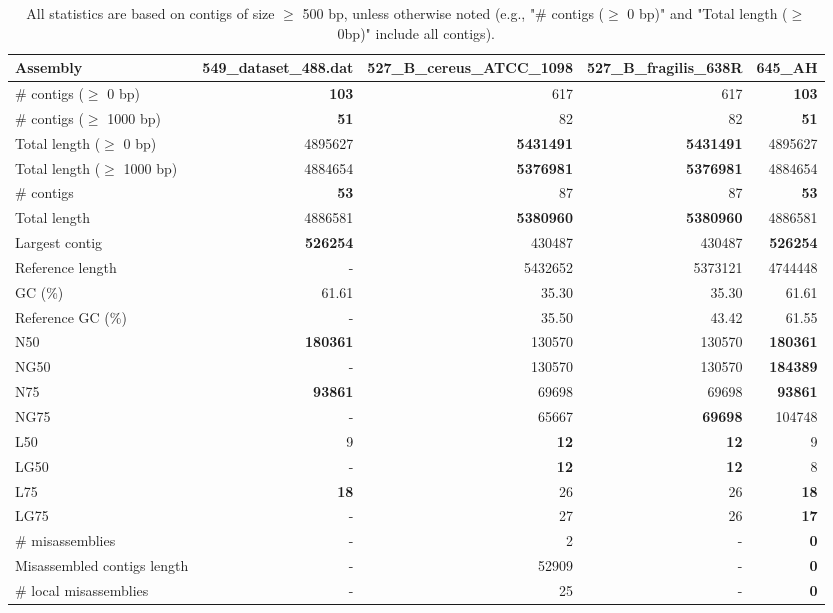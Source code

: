 \documentclass[12pt,a4paper]{article}
\begin{document}
\begin{table}[ht]
\begin{center}
\caption{All statistics are based on contigs of size $\geq$ 500 bp, unless otherwise noted (e.g., "\# contigs ($\geq$ 0 bp)" and "Total length ($\geq$ 0bp)" include all contigs).}
\begin{tabular}{|l*{4}{|r}|}
\hline
Assembly & 549\_dataset\_488.dat & 527\_B\_cereus\_ATCC\_1098 & 527\_B\_fragilis\_638R & 645\_AH \\ \hline
\# contigs ($\geq$ 0 bp) & {\bf 103} & 617 & 617 & {\bf 103} \\ \hline
\# contigs ($\geq$ 1000 bp) & {\bf 51} & 82 & 82 & {\bf 51} \\ \hline
Total length ($\geq$ 0 bp) & 4895627 & {\bf 5431491} & {\bf 5431491} & 4895627 \\ \hline
Total length ($\geq$ 1000 bp) & 4884654 & {\bf 5376981} & {\bf 5376981} & 4884654 \\ \hline
\# contigs & {\bf 53} & 87 & 87 & {\bf 53} \\ \hline
Total length & 4886581 & {\bf 5380960} & {\bf 5380960} & 4886581 \\ \hline
Largest contig & {\bf 526254} & 430487 & 430487 & {\bf 526254} \\ \hline
Reference length & - & 5432652 & 5373121 & 4744448 \\ \hline
GC (\%) & 61.61 & 35.30 & 35.30 & 61.61 \\ \hline
Reference GC (\%) & - & 35.50 & 43.42 & 61.55 \\ \hline
N50 & {\bf 180361} & 130570 & 130570 & {\bf 180361} \\ \hline
NG50 & - & 130570 & 130570 & {\bf 184389} \\ \hline
N75 & {\bf 93861} & 69698 & 69698 & {\bf 93861} \\ \hline
NG75 & - & 65667 & {\bf 69698} & 104748 \\ \hline
L50 & 9 & {\bf 12} & {\bf 12} & 9 \\ \hline
LG50 & - & {\bf 12} & {\bf 12} & 8 \\ \hline
L75 & {\bf 18} & 26 & 26 & {\bf 18} \\ \hline
LG75 & - & 27 & 26 & {\bf 17} \\ \hline
\# misassemblies & - & 2 & - & {\bf 0} \\ \hline
Misassembled contigs length & - & 52909 & - & {\bf 0} \\ \hline
\# local misassemblies & - & 25 & - & {\bf 0} \\ \hline

\end{tabular}
\end{center}
\end{table}
\end{document}
